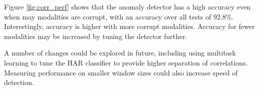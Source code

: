 Figure \ref{fig:corr_perf} shows that the anomaly detector has a high accuracy even when may modalities are corrupt, with an accuracy over all tests of 92.8\%. Interestingly, accuracy is higher with more corrupt modalities. Accuracy for fewer modalities may be increased by tuning the detector further.

A number of changes could be explored in future, including using multitask learning to tune the HAR classifier to provide higher separation of correlations. Measuring performance on smaller window sizes could also increase speed of detection.
